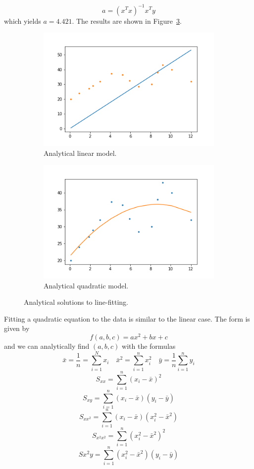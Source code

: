 \documentclass[11pt,margin=1in]{scrartcl}
\begin{document}
\[a = (x^Tx)^{-1}x^Ty \]
which yields $a = 4.421$.
The results are shown in Figure~\ref{fig:analytical}.
\begin{figure}
	\centering
	\begin{subfigure}{0.4\textwidth}
	
		\includegraphics[scale=0.4]{p1Linear}
		\caption{Analytical linear model.}
		\label{fig:p1Linear}
	\end{subfigure}
	\hfill
	\begin{subfigure}{0.4\textwidth}
	
		\includegraphics[scale=0.4]{p1Quad}
		\caption{Analytical quadratic model.}
		\label{fig:p1Quad}
	\end{subfigure}

	\caption{Analytical solutions to line-fitting.}
	\label{fig:analytical}
\end{figure}




Fitting a quadratic equation to the data is similar to the linear case.
The form is given by 
\begin{equation}
	\label{eq:quadratic}
	f(a, b, c) = ax^2 + bx + c
\end{equation}
and we can analytically find $(a, b, c)$ with the formulas
$$\bar{x} = \frac{1}{n}=\sum_{i=1}^{N} x_i\quad \bar{x}^2 = \sum_{i=1}^{n}x_i^2\quad\bar{y} = \frac{1}{n}\sum_{i=1}^{n}y_i$$
$$S_{xx} = \sum_{i=1}^{n}(x_i - \bar{x})^2$$
$$S_{xy} = \sum_{i=1}^{n}(x_i-\bar{x})(y_i-\bar{y})$$
$$S_{xx^2} = \sum_{i=1}^{n}(x_i - \bar{x})(x_i^2 - \bar{x}^2)$$
$$S_{x^2x^2} = \sum_{i=1}^{n}(x_i^2 - \bar{x}^2)^2$$
$$S{x^2y} = \sum_{i=1}^{n}(x_i^2-\bar{x}^2)(y_i-\bar{y})$$
\end{document}
